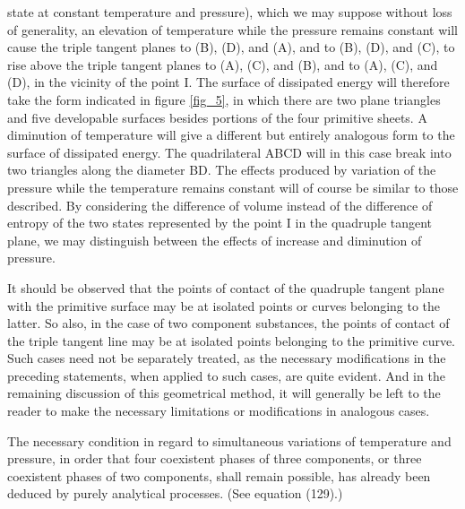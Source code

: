 \documentclass[12pt]{article}
\begin{document}
state at constant temperature and pressure), which we may suppose without loss of generality, an elevation of temperature while the pressure remains constant will cause the triple tangent planes to (B), (D), and (A), and to (B), (D), and (C), to rise above the triple tangent planes to (A), (C), and (B), and to (A), (C), and (D), in the vicinity of the point I.  The surface of dissipated energy will therefore take the form indicated in figure \ref{fig_5}, in which there are two plane triangles and five developable surfaces besides portions of the four primitive sheets. A diminution of temperature will give a different but entirely analogous form to the surface of dissipated energy. The quadrilateral ABCD will in this case break into two triangles along the diameter BD. The effects produced by variation of the pressure while the temperature remains constant will of course be similar to those described. By considering the difference of volume instead of the difference of entropy of the two states represented by the point I in the quadruple tangent plane, we may distinguish between the effects of increase and diminution of pressure. 


It should be observed that the points of contact of the quadruple tangent plane with the primitive surface may be at isolated points or curves belonging to the latter. So also, in the case of two component substances, the points of contact of the triple tangent line may be at isolated points belonging to the primitive curve. Such cases need not be separately treated, as the necessary modifications in the preceding statements, when applied to such cases, are quite evident. And in the remaining discussion of this geometrical method, it will generally be left to the reader to make the necessary limitations or modifications in analogous cases.


The necessary condition in regard to simultaneous variations of temperature and pressure, in order that four coexistent phases of three components, or three coexistent phases of two components, shall remain possible, has already been deduced by purely analytical processes. (See equation (129).)
\end{document}
